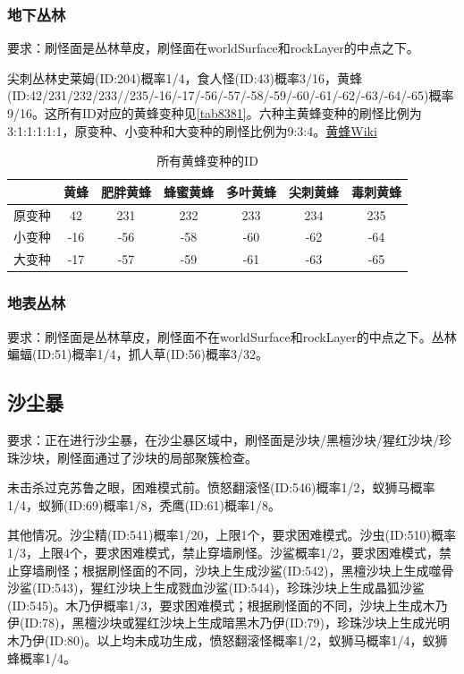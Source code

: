 \subsubsection{地下丛林}
要求：刷怪面是丛林草皮，刷怪面在worldSurface和rockLayer的中点之下。

尖刺丛林史莱姆(ID:204)概率1/4，食人怪(ID:43)概率3/16，黄蜂(ID:42/231/232/233//235/-16/-17/-56/-57/-58/-59/-60/-61/-62/-63/-64/-65)概率9/16。这所有ID对应的黄蜂变种见\autoref{tab8381}。六种主黄蜂变种的刷怪比例为3:1:1:1:1:1，原变种、小变种和大变种的刷怪比例为9:3:4。\href{https://terraria-zh.gamepedia.com/黄蜂}{黄蜂Wiki}

\begin{table}[!h]
    \centering
    \begin{tabular}{c|cccccc}
         &黄蜂&肥胖黄蜂&蜂蜜黄蜂&多叶黄蜂&尖刺黄蜂&毒刺黄蜂\\\hline
         原变种&42&231&232&233&234&235\\
         小变种&-16&-56&-58&-60&-62&-64\\
         大变种&-17&-57&-59&-61&-63&-65
    \end{tabular}
    \caption{所有黄蜂变种的ID}
    \label{tab8381}
\end{table}

\subsubsection{地表丛林}
要求：刷怪面是丛林草皮，刷怪面不在worldSurface和rockLayer的中点之下。丛林蝙蝠(ID:51)概率1/4，抓人草(ID:56)概率3/32。

\subsection{沙尘暴}
要求：正在进行沙尘暴，在沙尘暴区域中，刷怪面是沙块/黑檀沙块/猩红沙块/珍珠沙块，刷怪面通过了沙块的局部聚簇检查。

未击杀过克苏鲁之眼，困难模式前。愤怒翻滚怪(ID:546)概率1/2，蚁狮马概率1/4，蚁狮(ID:69)概率1/8，秃鹰(ID:61)概率1/8。

其他情况。沙尘精(ID:541)概率1/20，上限1个，要求困难模式。沙虫(ID:510)概率1/3，上限4个，要求困难模式，禁止穿墙刷怪。沙鲨概率1/2，要求困难模式，禁止穿墙刷怪；根据刷怪面的不同，沙块上生成沙鲨(ID:542)，黑檀沙块上生成噬骨沙鲨(ID:543)，猩红沙块上生成戮血沙鲨(ID:544)，珍珠沙块上生成晶狐沙鲨(ID:545)。木乃伊概率1/3，要求困难模式；根据刷怪面的不同，沙块上生成木乃伊(ID:78)，黑檀沙块或猩红沙块上生成暗黑木乃伊(ID:79)，珍珠沙块上生成光明木乃伊(ID:80)。以上均未成功生成，愤怒翻滚怪概率1/2，蚁狮马概率1/4，蚁狮蜂概率1/4。

